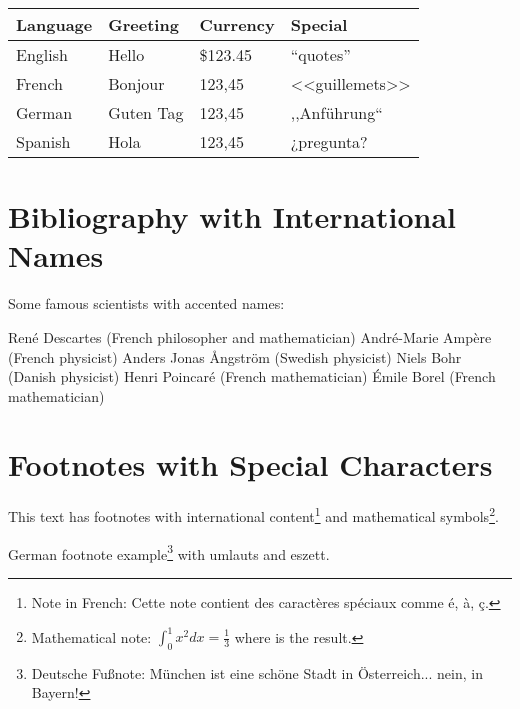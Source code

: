 \documentclass[12pt]{article}
\begin{document}
\begin{center}
\begin{tabular}{|l|l|l|l|}
\hline
Language & Greeting & Currency & Special \\
\hline
English & Hello & \$123.45 & ``quotes'' \\
French & Bonjour & \texteuro{}123,45 & <<guillemets>> \\
German & Guten Tag & \texteuro{}123,45 & ,,Anf\"uhrung`` \\
Spanish & Hola & \texteuro{}123,45 & ¿pregunta? \\
\hline
\end{tabular}
\end{center}

\section{Bibliography with International Names}

Some famous scientists with accented names:

Ren\'e Descartes (French philosopher and mathematician)
Andr\'e-Marie Amp\`ere (French physicist)
Anders Jonas \AA{}ngstr\"om (Swedish physicist)
Niels Bohr (Danish physicist)
Henri Poincar\'e (French mathematician)
\'Emile Borel (French mathematician)

\section{Footnotes with Special Characters}

This text has footnotes with international content\footnote{Note in French: Cette note contient des caract\`eres sp\'eciaux comme \'e, \`a, \c{c}.} and mathematical symbols\footnote{Mathematical note: $\int_0^1 x^2 dx = \frac{1}{3}$ where \textonethird{} is the result.}.

German footnote example\footnote{Deutsche Fu\ss{}note: M\"unchen ist eine sch\"one Stadt in \"Osterreich... nein, in Bayern!} with umlauts and eszett.
\end{document}
